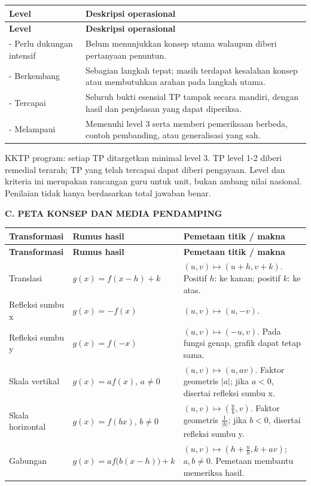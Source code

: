 \documentclass[11pt,a4paper]{article}
\begin{document}
{\small\setlength{\tabcolsep}{2mm}\renewcommand{\arraystretch}{1.35}\begin{longtable}{|>{\raggedright\arraybackslash}p{41.693mm}|>{\raggedright\arraybackslash}p{127.857mm}|}\hline
\rowcolor{gray!10}\textbf{Level} & \textbf{Deskripsi operasional}\\ \hline
\endfirsthead
\rowcolor{gray!10}\textbf{Level} & \textbf{Deskripsi operasional}\\ \hline
\endhead
1 - Perlu dukungan intensif & Belum menunjukkan konsep utama walaupun diberi pertanyaan penuntun.\\ \hline
2 - Berkembang & Sebagian langkah tepat; masih terdapat kesalahan konsep atau membutuhkan arahan pada langkah utama.\\ \hline
3 - Tercapai & Seluruh bukti esensial TP tampak secara mandiri, dengan hasil dan penjelasan yang dapat diperiksa.\\ \hline
4 - Melampaui & Memenuhi level 3 serta memberi pemeriksaan berbeda, contoh pembanding, atau generalisasi yang sah.\\ \hline
\end{longtable}}\medskip
{\small KKTP program: setiap TP ditargetkan minimal level 3. TP level 1-2 diberi remedial terarah; TP yang telah tercapai dapat diberi pengayaan. Level dan kriteria ini merupakan rancangan guru untuk unit, bukan ambang nilai nasional. Penilaian tidak hanya berdasarkan total jawaban benar.\par}\medskip
\clearpage
\begin{center}\bfseries\large C. PETA KONSEP DAN MEDIA PENDAMPING\end{center}\medskip
{\small\setlength{\tabcolsep}{2mm}\renewcommand{\arraystretch}{1.35}\begin{longtable}{|>{\raggedright\arraybackslash}p{29.624mm}|>{\raggedright\arraybackslash}p{54.310mm}|>{\raggedright\arraybackslash}p{81.466mm}|}\hline
\rowcolor{gray!10}\textbf{Transformasi} & \textbf{Rumus hasil} & \textbf{Pemetaan titik / makna}\\ \hline
\endfirsthead
\rowcolor{gray!10}\textbf{Transformasi} & \textbf{Rumus hasil} & \textbf{Pemetaan titik / makna}\\ \hline
\endhead
Translasi & \(g(x)=f(x-h)+k\) & \((u,v)\mapsto(u+h,v+k)\). Positif \(h\): ke kanan; positif \(k\): ke atas.\\ \hline
Refleksi sumbu x & \(g(x)=-f(x)\) & \((u,v)\mapsto(u,-v)\).\\ \hline
Refleksi sumbu y & \(g(x)=f(-x)\) & \((u,v)\mapsto(-u,v)\). Pada fungsi genap, grafik dapat tetap sama.\\ \hline
Skala vertikal & \(g(x)=af(x)\), \(a\ne0\) & \((u,v)\mapsto(u,av)\). Faktor geometris \(|a|\); jika \(a<0\), disertai refleksi sumbu x.\\ \hline
Skala horizontal & \(g(x)=f(bx)\), \(b\ne0\) & \((u,v)\mapsto\left(\frac{u}{b},v\right)\). Faktor geometris \(\frac1{|b|}\); jika \(b<0\), disertai refleksi sumbu y.\\ \hline
Gabungan & \(g(x)=af\bigl(b(x-h)\bigr)+k\) & \((u,v)\mapsto\left(h+\frac{u}{b},k+av\right)\); \(a,b\ne0\). Pemetaan membantu memeriksa hasil.\\ \hline
\end{longtable}}\medskip
\end{document}
